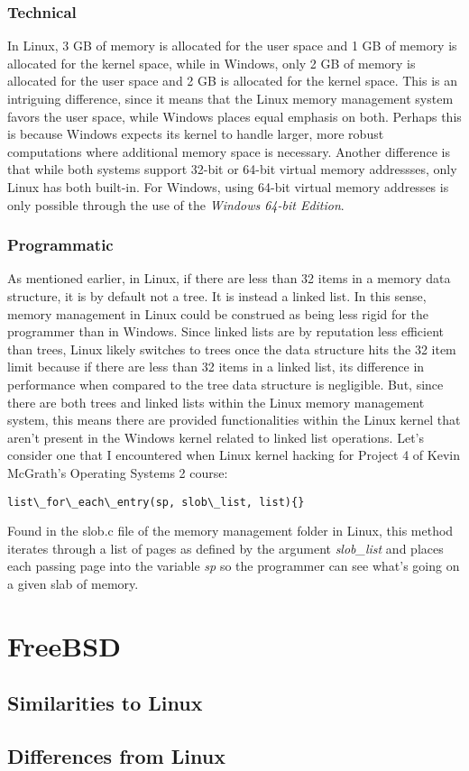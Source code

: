 \documentclass[letterpaper,10pt,titlepage]{article}
\begin{document}
\subsubsection{Technical}
In Linux, 3 GB of memory is allocated for the user space and 1 GB of memory is allocated for the kernel space, while in Windows, only 2 GB of memory is allocated for the user space and 2 GB is allocated for the kernel space. This is an intriguing difference, since it means that the Linux memory management system favors the user space, while Windows places equal emphasis on both. Perhaps this is because Windows expects its kernel to handle larger, more robust computations where additional memory space is necessary. Another difference is that while both systems support 32-bit or 64-bit virtual memory addressses, only Linux has both built-in. For Windows, using 64-bit virtual memory addresses is only possible through the use of the \emph{Windows 64-bit Edition}.
\subsubsection{Programmatic}
As mentioned earlier, in Linux, if there are less than 32 items in a memory data structure, it is by default not a tree. It is instead a linked list. In this sense, memory management in Linux could be construed as being less rigid for the programmer than in Windows. Since linked lists are by reputation less efficient than trees, Linux likely switches to trees once the data structure hits the 32 item limit because if there are less than 32 items in a linked list, its difference in performance when compared to the tree data structure is negligible. But, since there are both trees and linked lists within the Linux memory management system, this means there are provided functionalities within the Linux kernel that aren't present in the Windows kernel related to linked list operations. Let's consider one that I encountered when Linux kernel hacking for Project 4 of Kevin McGrath's Operating Systems 2 course: 
\begin{lstlisting}
list\_for\_each\_entry(sp, slob\_list, list){}
\end{lstlisting}
Found in the slob.c file of the memory management folder in Linux, this method iterates through a list of pages as defined by the argument \emph{slob\_list} 
and places each passing page into the variable \emph{sp} so the programmer can see what's going on a given slab of memory.
\section{FreeBSD}
\subsection{Similarities to Linux}
\subsection{Differences from Linux}
\newpage
{}

\end{document}
